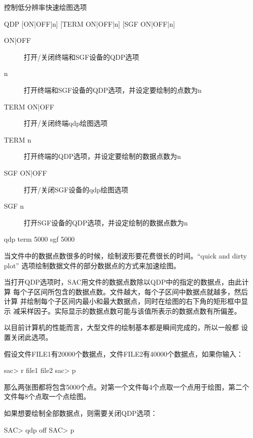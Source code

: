\label{cmd:qdp}

控制低分辨率快速绘图选项

\begin{SACSTX}
QDP [ON|OFF|n] [TERM ON|OFF|n] [SGF ON|OFF|n]
\end{SACSTX}

\begin{description}
\item [ON|OFF] 打开/关闭终端和SGF设备的QDP选项
\item [n] 打开终端和SGF设备的QDP选项，并设定要绘制的点数为n
\item [TERM ON|OFF] 打开/关闭终端qdp绘图选项
\item [TERM n] 打开终端的QDP选项，并设定要绘制的数据点数为n
\item [SGF ON|OFF] 打开/关闭SGF设备的qdp绘图选项
\item [SGF n] 打开SGF设备的QDP选项，并设定绘制的数据点数为n
\end{description}

\begin{SACDFT}
qdp term 5000 sgf 5000
\end{SACDFT}

当文件中的数据点数很多的时候，绘制波形要花费很长的时间。``quick and dirty plot''
选项绘制数据文件的部分数据点的方式来加速绘图。

当打开QDP选项时，SAC用文件的数据点数除以QDP中的指定的数据点，由此计算
每个子区间所包含的数据点数。文件越大，每个子区间中数据点就越多，然后计算
并绘制每个子区间内最小和最大数据点，同时在绘图的右下角的矩形框中显示
减采样因子。实际显示的数据点数可能与该值所表示的数据点数有所偏差。

以目前计算机的性能而言，大型文件的绘制基本都是瞬间完成的，所以一般都
设置关闭此选项。

假设文件FILE1有20000个数据点，文件FILE2有40000个数据点，如果你输入：
\begin{SACCode}
sac> r file1 file2
sac> p
\end{SACCode}
那么两张图都将包含5000个点。对第一个文件每4个点取一个点用于绘图，第二个
文件每8个点取一个点绘图。

如果想要绘制全部数据点，则需要关闭QDP选项：
\begin{SACCode}
SAC> qdp off
SAC> p
\end{SACCode}
